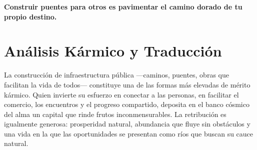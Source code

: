 
\vspace{1em}
\begin{center}
    \textbf{\Large Construir puentes para otros es pavimentar el camino dorado de tu propio destino.}
\end{center}
\vspace{1em}

\section{Análisis Kármico y Traducción}
\begin{figure}
  \vspace{-1.5em}
  \begin{center}
  \end{center}
  \vspace{-1.5em}
\end{figure}
La construcción de infraestructura pública —caminos, puentes, obras que facilitan la vida de todos— constituye una de las formas más elevadas de mérito kármico. Quien invierte su esfuerzo en conectar a las personas, en facilitar el comercio, los encuentros y el progreso compartido, deposita en el banco cósmico del alma un capital que rinde frutos inconmensurables. La retribución es igualmente generosa: prosperidad natural, abundancia que fluye sin obstáculos y una vida en la que las oportunidades se presentan como ríos que buscan su cauce natural.

